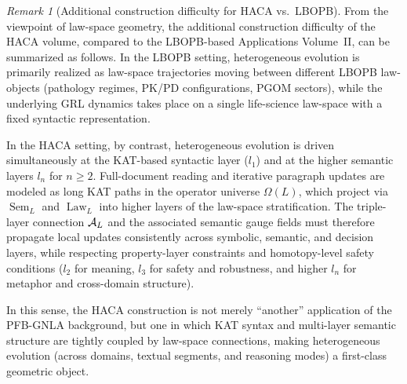 \documentclass[11pt]{book}
\theoremstyle{plain}
\theoremstyle{definition}
\theoremstyle{remark}
\newtheorem{remark}[theorem]{Remark}
\begin{document}
\begin{remark}[Additional construction difficulty for HACA vs.\ LBOPB]
\label{rem:haca-vs-lbopb-difficulty}
From the viewpoint of law-space geometry, the additional construction
difficulty of the HACA volume, compared to the LBOPB-based
Applications Volume~II, can be summarized as follows. In the LBOPB
setting, heterogeneous evolution is primarily realized as law-space
trajectories moving between different LBOPB law-objects (pathology
regimes, PK/PD configurations, PGOM sectors), while the underlying GRL
dynamics takes place on a single life-science law-space with a fixed
syntactic representation.

In the HACA setting, by contrast, heterogeneous evolution is driven
simultaneously at the KAT-based syntactic layer ($l_1$) and at the
higher semantic layers $l_n$ for $n\ge 2$. Full-document reading and
iterative paragraph updates are modeled as long KAT paths in the
operator universe $\Omega(L)$, which project via
$\operatorname{Sem}_L$ and $\operatorname{Law}_L$ into higher layers of
the law-space stratification. The triple-layer connection $\mathcal{A}_L$
and the associated semantic gauge fields must therefore propagate
local updates consistently across symbolic, semantic, and decision
layers, while respecting property-layer constraints and homotopy-level
safety conditions ($l_2$ for meaning, $l_3$ for safety and robustness,
and higher $l_n$ for metaphor and cross-domain structure).

In this sense, the HACA construction is not merely ``another''
application of the PFB-GNLA background, but one in which KAT syntax and
multi-layer semantic structure are tightly coupled by law-space
connections, making heterogeneous evolution (across domains, textual
segments, and reasoning modes) a first-class geometric object.
\end{remark}
\end{document}
